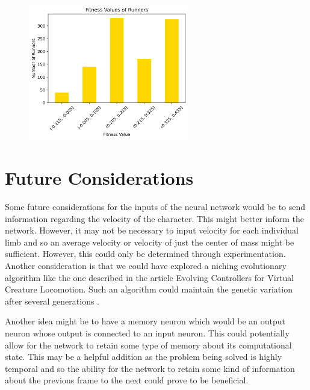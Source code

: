 \documentclass[letterpaper]{article} %
\begin{document}
\begin{figure}[h]
\centering
\includegraphics[width=7cm]{fitness_dist.png}
\end{figure}

\section{Future Considerations}

Some future considerations for the inputs of the neural network would be to send information regarding the velocity of the character. This might better inform the network. However, it may not be necessary to input velocity for each individual limb and so an average velocity or velocity of just the center of mass might be sufficient. However, this could only be determined through experimentation. Another consideration is that we could have explored a niching evolutionary algorithm like the one described in the article Evolving Controllers for Virtual Creature Locomotion. Such an algorithm could maintain the genetic variation after several generations \cite{sanders_lobb_riddle_2003}.  

\par Another idea might be to have a memory neuron which would be an output neuron whose output is connected to an input neuron. This could potentially allow for the network to retain some type of memory about its computational state. This may be a helpful addition as the problem being solved is highly temporal and so the ability for the network to retain some kind of information about the previous frame to the next could prove to be beneficial.


\end{document}
